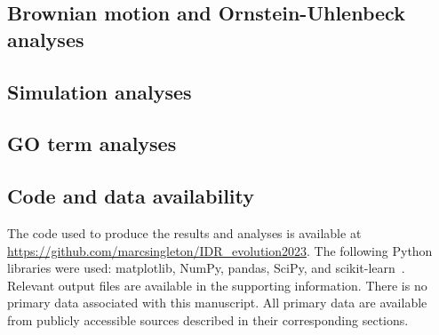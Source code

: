 \subsection{Brownian motion and Ornstein-Uhlenbeck analyses}

\subsection{Simulation analyses}

\subsection{GO term analyses}

\subsection{Code and data availability}
The code used to produce the results and analyses is available at \url{https://github.com/marcsingleton/IDR_evolution2023}. The following Python libraries were used: matplotlib, NumPy, pandas, SciPy, and scikit-learn~\cite{Hunter2007, Harris2020, McKinney2010, Virtanen2020, Pedregosa2011}. Relevant output files are available in the supporting information. There is no primary data associated with this manuscript. All primary data are available from publicly accessible sources described in their corresponding sections.